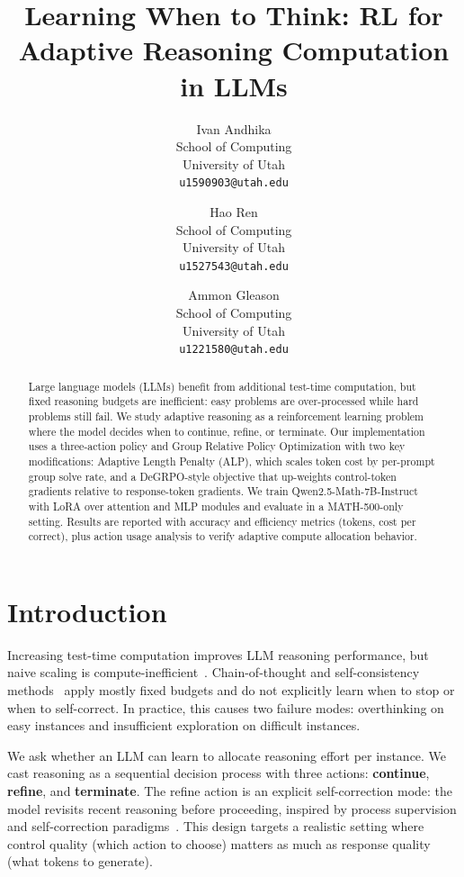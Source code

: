 \documentclass{article}
\title{Learning When to Think: RL for Adaptive Reasoning Computation in LLMs}
\author{%
  Ivan Andhika \\
  School of Computing\\
  University of Utah\\
  \texttt{u1590903@utah.edu} \\
  \and
  Hao Ren \\
  School of Computing\\
  University of Utah\\
  \texttt{u1527543@utah.edu} \\
  \and
  Ammon Gleason \\
  School of Computing\\
  University of Utah\\
  \texttt{u1221580@utah.edu} \\
}
\begin{document}
\maketitle

\begin{abstract}
Large language models (LLMs) benefit from additional test-time computation, but fixed reasoning budgets are inefficient: easy problems are over-processed while hard problems still fail. We study adaptive reasoning as a reinforcement learning problem where the model decides when to continue, refine, or terminate. Our implementation uses a three-action policy and Group Relative Policy Optimization with two key modifications: Adaptive Length Penalty (ALP), which scales token cost by per-prompt group solve rate, and a DeGRPO-style objective that up-weights control-token gradients relative to response-token gradients. We train Qwen2.5-Math-7B-Instruct with LoRA over attention and MLP modules and evaluate in a MATH-500-only setting. Results are reported with accuracy and efficiency metrics (tokens, cost per correct), plus action usage analysis to verify adaptive compute allocation behavior.
\end{abstract}

\section{Introduction}

Increasing test-time computation improves LLM reasoning performance, but naive scaling is compute-inefficient~\citep{snell2024scaling}. Chain-of-thought and self-consistency methods~\citep{wei2022chainofthought,wang2023selfconsistency} apply mostly fixed budgets and do not explicitly learn when to stop or when to self-correct. In practice, this causes two failure modes: overthinking on easy instances and insufficient exploration on difficult instances.

We ask whether an LLM can learn to allocate reasoning effort per instance. We cast reasoning as a sequential decision process with three actions: \textbf{continue}, \textbf{refine}, and \textbf{terminate}. The refine action is an explicit self-correction mode: the model revisits recent reasoning before proceeding, inspired by process supervision and self-correction paradigms~\citep{lightman2023lets,kumar2024score,uesato2022process}. This design targets a realistic setting where control quality (which action to choose) matters as much as response quality (what tokens to generate).
\end{document}
